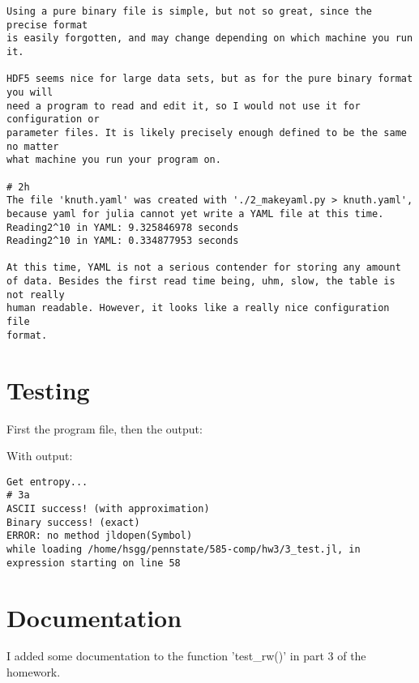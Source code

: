 \documentclass[11pt]{article}
\begin{document}
\begin{verbatim}
Using a pure binary file is simple, but not so great, since the precise format
is easily forgotten, and may change depending on which machine you run it.

HDF5 seems nice for large data sets, but as for the pure binary format you will
need a program to read and edit it, so I would not use it for configuration or
parameter files. It is likely precisely enough defined to be the same no matter
what machine you run your program on.

# 2h
The file 'knuth.yaml' was created with './2_makeyaml.py > knuth.yaml',
because yaml for julia cannot yet write a YAML file at this time.
Reading2^10 in YAML: 9.325846978 seconds
Reading2^10 in YAML: 0.334877953 seconds

At this time, YAML is not a serious contender for storing any amount
of data. Besides the first read time being, uhm, slow, the table is not really
human readable. However, it looks like a really nice configuration file
format.
\end{verbatim}


\section{Testing}
First the program file, then the output:


With output:

\begin{verbatim}
Get entropy...
# 3a
ASCII success! (with approximation)
Binary success! (exact)
ERROR: no method jldopen(Symbol)
while loading /home/hsgg/pennstate/585-comp/hw3/3_test.jl, in expression starting on line 58
\end{verbatim}


\section{Documentation}
I added some documentation to the function 'test\_rw()' in part 3 of the
homework.
\end{document}

